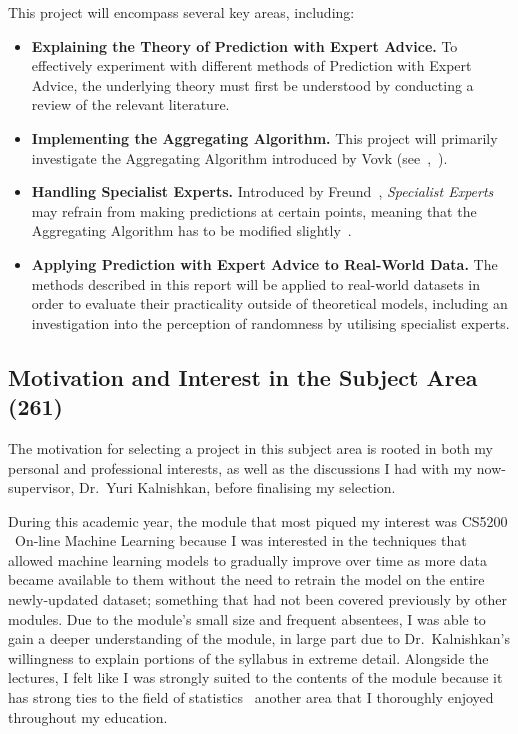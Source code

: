 This project will encompass several key areas, including:
\begin{itemize}
    \item \textbf{Explaining the Theory of Prediction with Expert Advice.} To effectively experiment with different methods of Prediction with Expert Advice, the underlying theory must first be understood by conducting a review of the relevant literature.
    \item \textbf{Implementing the Aggregating Algorithm.} This project will primarily investigate the Aggregating Algorithm introduced by Vovk (see~\cite{vovk:1990},\ \cite{vovk:1998}).
    \item \textbf{Handling Specialist Experts.} Introduced by Freund~\cite{freund:1997}, \textit{Specialist Experts} may refrain from making predictions at certain points, meaning that the Aggregating Algorithm has to be modified slightly~\cite{kalnishkan:2015}.
    \item \textbf{Applying Prediction with Expert Advice to Real-World Data.} The methods described in this report will be applied to real-world datasets in order to evaluate their practicality outside of theoretical models, including an investigation into the perception of randomness by utilising specialist experts.
\end{itemize}

\subsection{Motivation and Interest in the Subject Area \textbf{(261)}}
The motivation for selecting a project in this subject area is rooted in both my personal and professional interests, as well as the discussions I had with my now-supervisor, Dr.\ Yuri Kalnishkan, before finalising my selection.

During this academic year, the module that most piqued my interest was CS5200 \textendash\ On-line Machine Learning because I was interested in the techniques that allowed machine learning models to gradually improve over time as more data became available to them without the need to retrain the model on the entire newly-updated dataset; something that had not been covered previously by other modules. Due to the module's small size and frequent absentees, I was able to gain a deeper understanding of the module, in large part due to Dr.\ Kalnishkan's willingness to explain portions of the syllabus in extreme detail. Alongside the lectures, I felt like I was strongly suited to the contents of the module because it has strong ties to the field of statistics \textendash\ another area that I thoroughly enjoyed throughout my education. 

